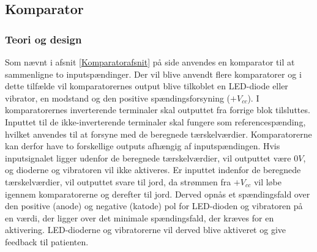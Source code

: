\subsection{Komparator}
\subsubsection{Teori og design}
Som nævnt i afsnit \ref{Komparatorafsnit} på side \pageref{Komparatorafsnit} anvendes en komparator til at sammenligne to inputspændinger. Der vil blive anvendt flere komparatorer og i dette tilfælde vil komparatorernes output blive tilkoblet en LED-diode eller vibrator, en modstand og den positive spændingsforsyning ($+V_{cc}$). I komparatorernes inverterende terminaler skal outputtet fra forrige blok tilsluttes. Inputtet til de ikke-inverterende terminaler skal fungere som referencespænding, hvilket anvendes til at forsyne med de beregnede tærskelværdier. Komparatorerne kan derfor have to forskellige outputs afhængig af inputspændingen. Hvis inputsignalet ligger udenfor de beregnede tærskelværdier, vil outputtet være $0V$, og dioderne og vibratoren vil ikke aktiveres. Er inputtet indenfor de beregnede tærskelværdier, vil outputtet svare til jord, da strømmen fra $+V_{cc}$ vil løbe igennem komparatorerne og derefter til jord. Derved opnås et spændingsfald over den positive (anode) og negative (katode) pol for LED-dioden og vibratoren på en værdi, der ligger over det minimale spændingsfald, der kræves for en aktivering. LED-dioderne og vibratorerne vil derved blive aktiveret og give feedback til patienten. \\

